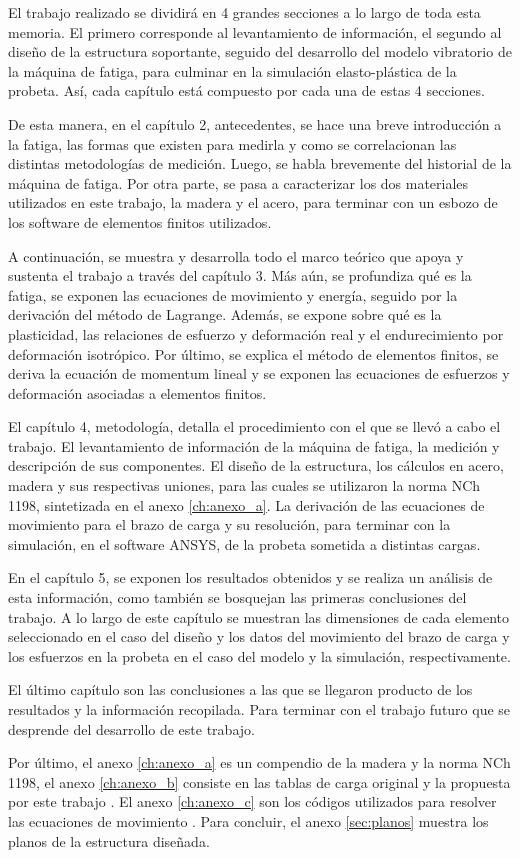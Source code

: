 El trabajo realizado se dividirá en 4 grandes secciones a lo largo de toda esta memoria. El primero corresponde al levantamiento de información, el segundo al diseño de la estructura soportante, seguido del desarrollo del modelo vibratorio de la máquina de fatiga, para culminar en la simulación elasto-plástica de la probeta. Así, cada capítulo está compuesto por cada una de estas 4 secciones.

De esta manera, en el capítulo 2, antecedentes, se hace una breve introducción a la fatiga, las formas que existen para medirla y como se correlacionan  las distintas metodologías de medición. Luego, se habla brevemente del historial de la máquina de fatiga. Por otra parte, se pasa a caracterizar los dos materiales utilizados en este trabajo, la madera y el acero, para terminar con un esbozo de los software de elementos finitos utilizados.

A continuación, se muestra y desarrolla todo el marco teórico que apoya y sustenta el trabajo a través del capítulo 3. Más aún, se profundiza qué es la fatiga, se exponen las ecuaciones de movimiento y energía, seguido por la derivación del método de Lagrange. Además, se expone sobre qué es la plasticidad, las relaciones de esfuerzo y deformación real y el endurecimiento por deformación isotrópico. Por último, se explica el método de elementos finitos, se deriva la ecuación de momentum lineal y se exponen las ecuaciones de esfuerzos y deformación asociadas a elementos finitos.

El capítulo 4, metodología, detalla el procedimiento con el que se llevó a cabo el trabajo. El levantamiento de información de la máquina de fatiga, la medición y descripción de sus componentes. El diseño de la estructura, los cálculos en acero, madera y sus respectivas uniones, para las cuales se utilizaron la norma NCh 1198, sintetizada en el anexo \ref{ch:anexo_a}. La derivación de las ecuaciones de movimiento para el brazo de carga y su resolución, para terminar con la simulación, en el software ANSYS, de la probeta sometida a distintas cargas.

En el capítulo 5, se exponen los resultados obtenidos y se realiza un análisis de esta información, como también se bosquejan las primeras conclusiones del trabajo. A lo largo de este capítulo se muestran las dimensiones de cada elemento seleccionado en el caso del diseño y los datos del movimiento del brazo de carga y los esfuerzos en la probeta en el caso del modelo y la simulación, respectivamente.

El último capítulo son las conclusiones a las que se llegaron producto de los resultados y la información recopilada. Para terminar con el trabajo futuro que se desprende del desarrollo de este trabajo.

Por último, el anexo \ref{ch:anexo_a} es un compendio de la madera y la norma NCh 1198, el anexo \ref{ch:anexo_b} consiste en las tablas de carga original y la propuesta por este trabajo . El anexo \ref{ch:anexo_c} son los códigos utilizados para resolver las ecuaciones de movimiento . Para concluir, el anexo \ref{sec:planos} muestra los planos de la estructura diseñada.




